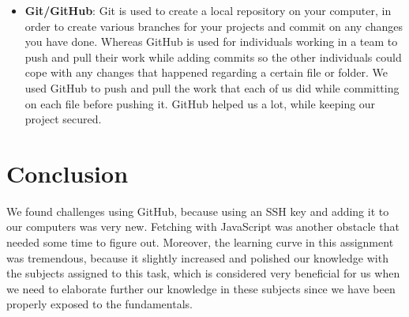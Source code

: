 \documentclass{article}
\begin{document}
\begin{itemize}
    \item \textbf{Git/GitHub}: Git is used to create a local repository on your computer, in order to create various branches for your projects and commit on any changes you have done. Whereas GitHub is used for individuals working in a team to push and pull their work while adding commits so the other individuals could cope with any changes that happened regarding a certain file or folder. We used GitHub to push and pull the work that each of us did while committing on each file before pushing it. GitHub helped us a lot, while keeping our project secured.
\end{itemize}

\section{Conclusion}
\begin{justify}
    We found challenges using GitHub, because using an SSH key and adding it to our computers was very new. Fetching with JavaScript was another obstacle that needed some time to figure out. Moreover, the learning curve in this assignment was tremendous, because it slightly increased and polished our knowledge with the subjects assigned to this task, which is considered very beneficial for us when we need to elaborate further our knowledge in these subjects since we have been properly exposed to the fundamentals.
\end{justify}
\end{document}
